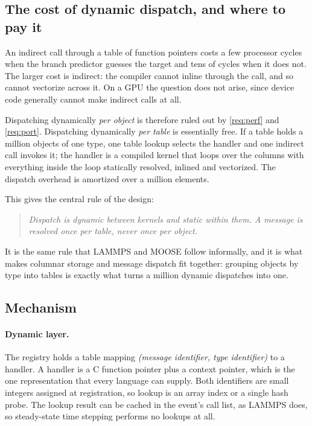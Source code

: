 \documentclass[11pt,a4paper]{article}
\begin{document}
\subsection{The cost of dynamic dispatch, and where to pay it}

An indirect call through a table of function pointers costs a few processor
cycles when the branch predictor guesses the target and tens of cycles when it
does not.  The larger cost is indirect: the compiler cannot inline through
the call, and so cannot vectorize across it.  On a GPU the question does not
arise, since device code generally cannot make indirect calls at all.

Dispatching dynamically \emph{per object} is therefore ruled out by
\ref{req:perf} and \ref{req:port}.  Dispatching dynamically \emph{per table}
is essentially free.  If a table holds a million objects of one type, one
table lookup selects the handler and one indirect call invokes it; the handler
is a compiled kernel that loops over the columns with everything inside the
loop statically resolved, inlined and vectorized.  The dispatch overhead is
amortized over a million elements.

This gives the central rule of the design:

\begin{quote}
\emph{Dispatch is dynamic between kernels and static within them.  A message
is resolved once per table, never once per object.}
\end{quote}

It is the same rule that LAMMPS and MOOSE follow informally, and it is what
makes columnar storage and message dispatch fit together: grouping objects by
type into tables is exactly what turns a million dynamic dispatches into one.

\subsection{Mechanism}
\label{sec:mechanism}

\paragraph{Dynamic layer.}  The registry holds a table mapping
\emph{(message identifier, type identifier)} to a handler.  A handler is a C
function pointer plus a context pointer, which is the one representation that
every language can supply.  Both identifiers are small integers assigned at
registration, so lookup is an array index or a single hash probe.  The lookup
result can be cached in the event's call list, as LAMMPS does, so steady-state
time stepping performs no lookups at all.
\end{document}
